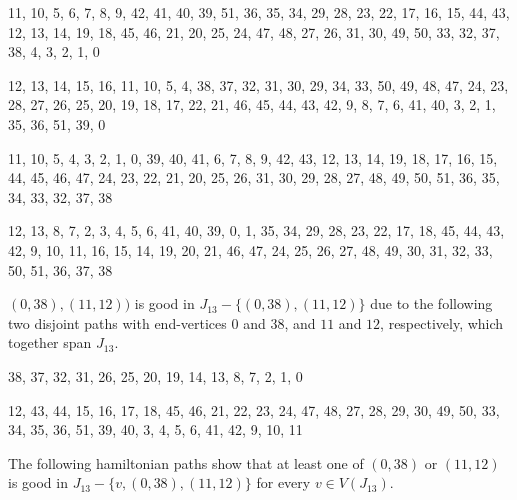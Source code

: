 \documentclass{amcjoucc}
\begin{document}
\begin{itemize}
{\small
\item 11, 10, 5, 6, 7, 8, 9, 42, 41, 40, 39, 51, 36, 35, 34, 29, 28, 23, 22, 17, 16, 15, 44, 43, 12, 13, 14, 19, 18, 45, 46, 21, 20, 25, 24, 47, 48, 27, 26, 31, 30, 49, 50, 33, 32, 37, 38, 4, 3, 2, 1, 0
\item 12, 13, 14, 15, 16, 11, 10, 5, 4, 38, 37, 32, 31, 30, 29, 34, 33, 50, 49, 48, 47, 24, 23, 28, 27, 26, 25, 20, 19, 18, 17, 22, 21, 46, 45, 44, 43, 42, 9, 8, 7, 6, 41, 40, 3, 2, 1, 35, 36, 51, 39, 0
\item 11, 10, 5, 4, 3, 2, 1, 0, 39, 40, 41, 6, 7, 8, 9, 42, 43, 12, 13, 14, 19, 18, 17, 16, 15, 44, 45, 46, 47, 24, 23, 22, 21, 20, 25, 26, 31, 30, 29, 28, 27, 48, 49, 50, 51, 36, 35, 34, 33, 32, 37, 38
\item 12, 13, 8, 7, 2, 3, 4, 5, 6, 41, 40, 39, 0, 1, 35, 34, 29, 28, 23, 22, 17, 18, 45, 44, 43, 42, 9, 10, 11, 16, 15, 14, 19, 20, 21, 46, 47, 24, 25, 26, 27, 48, 49, 30, 31, 32, 33, 50, 51, 36, 37, 38}
\end{itemize}


$(0,38),(11,12))$ is good in $J_{13} - \{(0,38),(11,12)\}$ due to the following two disjoint paths with end-vertices $0$ and $38$, and $11$ and $12$, respectively, which together span $J_{13}$.


\begin{itemize}
{\small
\item 38, 37, 32, 31, 26, 25, 20, 19, 14, 13, 8, 7, 2, 1, 0
\item 12, 43, 44, 15, 16, 17, 18, 45, 46, 21, 22, 23, 24, 47, 48, 27, 28, 29, 30, 49, 50, 33, 34, 35, 36, 51, 39, 40, 3, 4, 5, 6, 41, 42, 9, 10, 11}
\end{itemize}


The following hamiltonian paths show that at least one of $(0,38)$ or $(11,12)$ is good in $J_{13} - \{v,(0,38),(11,12)\}$ for every $v \in V(J_{13})$.
\end{document}
